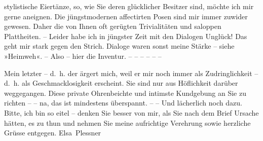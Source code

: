                stylistische Eiertänze, so, wie Sie deren glücklicher Besitzer sind, möchte ich mir
               gerne aneignen. Die jüngstmodernen affectirten Posen sind mir immer zuwider gewesen.
               Daher die von Ihnen oft gerügten Trivialitäten und saloppen Plattheiten. – Leider habe
               ich in jüngster Zeit mit den Dialogen Unglück! Das geht mir stark gegen
               den Strich. Dialoge waren sonst meine Stärke – siehe »Heimweh«. – Also – hier die Inventur. – – – – – –\pend
           
\pstart
           Mein letzter – d. h. der \label{K_L03713-4v}\label{K_L03713-4} ärgert mich, weil er mir
               noch immer als Zudringlichkeit – d. h. als Geschmacklosigkeit erscheint. Sie sind nur
               aus Höflichkeit darüber weggegangen. Diese private Ohrenbeichte und intimste  Kundgebung an Sie zu richten – – na, das ist
               mindestens überspannt. – – Und lächerlich noch dazu. Bitte, ich bin so eitel – denken
               Sie besser von mir, als Sie nach dem Brief Ursache hätten, es zu thun
               und nehmen Sie meine aufrichtige Verehrung sowie herzliche Grüsse entgegen.\pend
           \pstart \spacefill\mbox{Elsa Plessner}\pend{}\endnumbering{}  \newcommand{\dateiname}{L03713}\newcommand{\titel}{Elsa Plessner an Arthur Schnitzler, 23. 3. 1897}\newcommand{\editorInnen}{Selma Jahnke und Martin Anton Müller}
